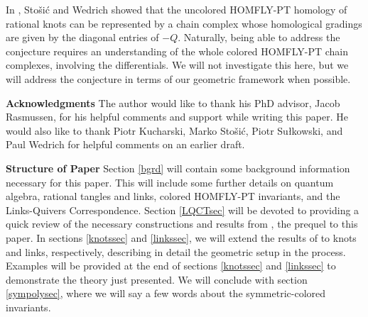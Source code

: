 \documentclass[11pt]{amsart}
\theoremstyle{plain}
\theoremstyle{definition}
\theoremstyle{remark}
\begin{document}
In \cite{SW21}, Sto\v si\'c and Wedrich showed that the uncolored HOMFLY-PT homology of rational knots can be represented by a chain complex whose homological gradings are given by the diagonal entries of $-Q$. Naturally, being able to address the conjecture requires an understanding of the whole colored HOMFLY-PT chain complexes, involving the differentials. We will not investigate this here, but we will address the conjecture in terms of our geometric framework when possible. 




\bigskip
\noindent
\textbf{Acknowledgments} The author would like to thank his PhD advisor, Jacob Rasmussen, for his helpful comments and support while writing this paper. He would also like to thank Piotr Kucharski, Marko Sto\v si\'c, Piotr Su\l{}kowski, and Paul Wedrich for helpful comments on an earlier draft.

\bigskip
\noindent
\textbf{Structure of Paper} Section \ref{bgrd} will contain some background information necessary for this paper. This will include some further details on quantum algebra, rational tangles and links, colored HOMFLY-PT invariants, and the Links-Quivers Correspondence. Section \ref{LQCTsec} will be devoted to providing a quick review of the necessary constructions and results from \cite{JHpI26}, the prequel to this paper. In sections \ref{knotssec} and \ref{linkssec}, we will extend the results of \cite{JHpI26} to knots and links, respectively, describing in detail the geometric setup in the process. Examples will be provided at the end of sections \ref{knotssec} and \ref{linkssec} to demonstrate the theory just presented. We will conclude with section \ref{sympolysec}, where we will say a few words about the symmetric-colored invariants.
\end{document}
